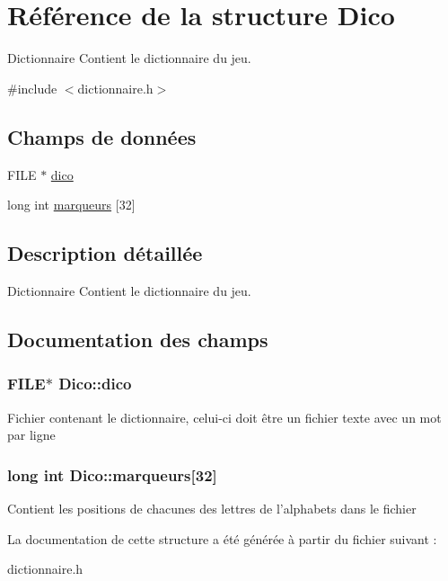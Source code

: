 \hypertarget{structDico}{\section{Référence de la structure Dico}
\label{structDico}
}


Dictionnaire Contient le dictionnaire du jeu.  




{\ttfamily \#include $<$dictionnaire.\-h$>$}

\subsection*{Champs de données}
\begin{DoxyCompactItemize}
\item 
F\-I\-L\-E $\ast$ \hyperlink{structDico_aa608808df162aebf2b2bfbc4723cfad6}{dico}
\item 
long int \hyperlink{structDico_a1a8a33881f938f4ddd946edc97ae82f8}{marqueurs} \mbox{[}32\mbox{]}
\end{DoxyCompactItemize}


\subsection{Description détaillée}
Dictionnaire Contient le dictionnaire du jeu. 

\subsection{Documentation des champs}
\hypertarget{structDico_aa608808df162aebf2b2bfbc4723cfad6}{
\subsubsection[{dico}]{\setlength{\rightskip}{0pt plus 5cm}F\-I\-L\-E$\ast$ Dico\-::dico}}\label{structDico_aa608808df162aebf2b2bfbc4723cfad6}
Fichier contenant le dictionnaire, celui-\/ci doit être un fichier texte avec un mot par ligne \hypertarget{structDico_a1a8a33881f938f4ddd946edc97ae82f8}{
\subsubsection[{marqueurs}]{\setlength{\rightskip}{0pt plus 5cm}long int Dico\-::marqueurs\mbox{[}32\mbox{]}}}\label{structDico_a1a8a33881f938f4ddd946edc97ae82f8}
Contient les positions de chacunes des lettres de l'alphabets dans le fichier 

La documentation de cette structure a été générée à partir du fichier suivant \-:\begin{DoxyCompactItemize}
\item 
dictionnaire.\-h\end{DoxyCompactItemize}
